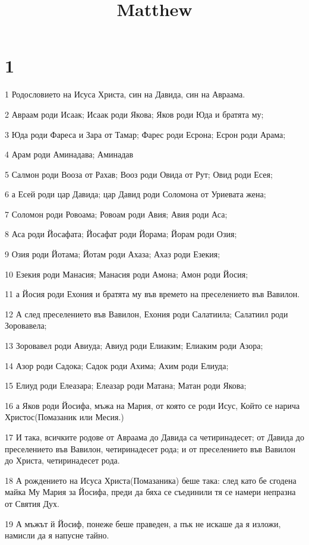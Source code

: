 

\title{Matthew}


\chapter{1}

\par 1 Родословието на Исуса Христа, син на Давида, син на Авраама.
\par 2 Авраам роди Исаак; Исаак роди Якова; Яков роди Юда и братята му;
\par 3 Юда роди Фареса и Зара от Тамар; Фарес роди Есрона; Есрон роди Арама;
\par 4 Арам роди Аминадава; Аминадав
\par 5 Салмон роди Вооза от Рахав; Вооз роди Овида от Рут; Овид роди Есея;
\par 6 а Есей роди цар Давида; цар Давид роди Соломона от Уриевата жена;
\par 7 Соломон роди Ровоама; Ровоам роди Авия; Авия роди Аса;
\par 8 Аса роди Йосафата; Йосафат роди Йорама; Йорам роди Озия;
\par 9 Озия роди Йотама; Йотам роди Ахаза; Ахаз роди Езекия;
\par 10 Езекия роди Манасия; Манасия роди Амона; Амон роди Йосия;
\par 11 а Йосия роди Ехония и братята му във времето на преселението във Вавилон.
\par 12 А след преселението във Вавилон, Ехония роди Салатиила; Салатиил роди Зоровавела;
\par 13 Зоровавел роди Авиуда; Авиуд роди Елиаким; Елиаким роди Азора;
\par 14 Азор роди Садока; Садок роди Ахима; Ахим роди Елиуда;
\par 15 Елиуд роди Елеазара; Елеазар роди Матана; Матан роди Якова;
\par 16 а Яков роди Йосифа, мъжа на Мария, от която се роди Исус, Който се нарича Христос(Помазаник или Месия.)
\par 17 И така, всичките родове от Авраама до Давида са четиринадесет; от Давида до преселението във Вавилон, четиринадесет рода; и от преселението във Вавилон до Христа, четиринадесет рода.
\par 18 А рождението на Исуса Христа(Помазаника) беше така: след като бе сгодена майка Му Мария за Йосифа, преди да бяха се съединили тя се намери непразна от Святия Дух.
\par 19 А мъжът й Йосиф, понеже беше праведен, а пък не искаше да я изложи, намисли да я напусне тайно.
